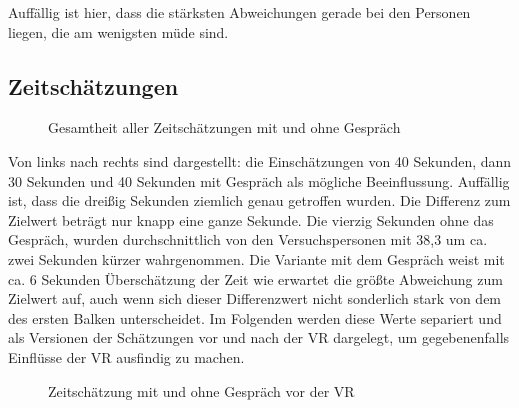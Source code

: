 \documentclass{Paper}
\begin{document}
Auffällig ist hier, dass die stärksten Abweichungen gerade bei den Personen liegen, die am wenigsten müde sind.

\subsection{Zeitschätzungen}
\begin{figure}[H]
\caption{Gesamtheit aller Zeitschätzungen mit und ohne Gespräch}
\label{ZeitGespr}
\end{figure}
\par
Von links nach rechts sind dargestellt: die Einschätzungen von 40 Sekunden, dann 30 Sekunden und 40 Sekunden mit Gespräch als mögliche Beeinflussung. Auffällig ist, dass die dreißig Sekunden ziemlich genau getroffen wurden. Die Differenz zum Zielwert beträgt nur knapp eine ganze Sekunde. Die vierzig Sekunden ohne das Gespräch, wurden durchschnittlich von den Versuchspersonen mit 38,3 um ca. zwei Sekunden kürzer wahrgenommen. Die Variante mit dem Gespräch weist mit ca. 6 Sekunden Überschätzung der Zeit wie erwartet die größte Abweichung zum Zielwert auf, auch wenn sich dieser Differenzwert nicht sonderlich stark von dem des ersten Balken unterscheidet. Im Folgenden werden diese Werte separiert und als Versionen der Schätzungen vor und nach der VR dargelegt, um gegebenenfalls Einflüsse der VR ausfindig zu machen.
\begin{figure}[H]
\caption{Zeitschätzung mit und ohne Gespräch vor der VR}
\label{ZeitVorVR}
\end{figure}
\end{document}

